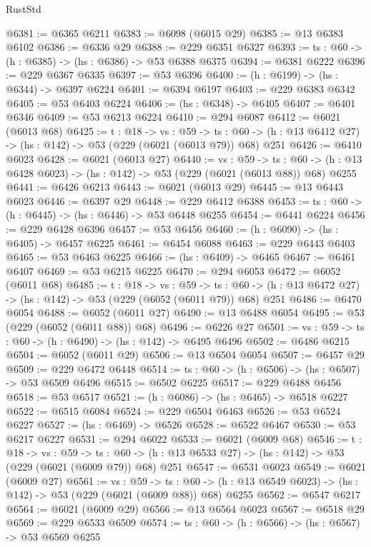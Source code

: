 \begin{lexlean}{RustStd}
\begin{coremodule}
@6381 := @6365 @6211
@6383 := @6098 (@6015 @29)
@6385 := @13 @6383 @6102
@6386 := @6336 @29
@6388 := @229 @6351 @6327
@6393 := {ts : @60} -> (h : @6385) -> (hs : @6386) -> @53 @6388 @6375
@6394 := @6381 @6222
@6396 := @229 @6367 @6335
@6397 := @53 @6396
@6400 := (h : @6199) -> (hs : @6344) -> @6397 @6224
@6401 := @6394 @6197
@6403 := @229 @6383 @6342
@6405 := @53 @6403 @6224
@6406 := (hs : @6348) -> @6405
@6407 := @6401 @6346
@6409 := @53 @6213 @6224
@6410 := @294 @6087
@6412 := @6021 (@6013 @68)
@6425 := {t : @18} ->
  {vs : @59} ->
  {ts : @60} -> (h : @13 @6412 @27) -> (hs : @142) -> @53 (@229 (@6021 (@6013 @79)) @68) @251
@6426 := @6410 @6023
@6428 := @6021 (@6013 @27)
@6440 := {vs : @59} ->
  {ts : @60} -> (h : @13 @6428 @6023) -> (hs : @142) -> @53 (@229 (@6021 (@6013 @88)) @68) @6255
@6441 := @6426 @6213
@6443 := @6021 (@6013 @29)
@6445 := @13 @6443 @6023
@6446 := @6397 @29
@6448 := @229 @6412 @6388
@6453 := {ts : @60} -> (h : @6445) -> (hs : @6446) -> @53 @6448 @6255
@6454 := @6441 @6224
@6456 := @229 @6428 @6396
@6457 := @53 @6456
@6460 := (h : @6090) -> (hs : @6405) -> @6457 @6225
@6461 := @6454 @6088
@6463 := @229 @6443 @6403
@6465 := @53 @6463 @6225
@6466 := (hs : @6409) -> @6465
@6467 := @6461 @6407
@6469 := @53 @6215 @6225
@6470 := @294 @6053
@6472 := @6052 (@6011 @68)
@6485 := {t : @18} ->
  {vs : @59} ->
  {ts : @60} -> (h : @13 @6472 @27) -> (hs : @142) -> @53 (@229 (@6052 (@6011 @79)) @68) @251
@6486 := @6470 @6054
@6488 := @6052 (@6011 @27)
@6490 := @13 @6488 @6054
@6495 := @53 (@229 (@6052 (@6011 @88)) @68)
@6496 := @6226 @27
@6501 := {vs : @59} -> {ts : @60} -> (h : @6490) -> (hs : @142) -> @6495 @6496
@6502 := @6486 @6215
@6504 := @6052 (@6011 @29)
@6506 := @13 @6504 @6054
@6507 := @6457 @29
@6509 := @229 @6472 @6448
@6514 := {ts : @60} -> (h : @6506) -> (hs : @6507) -> @53 @6509 @6496
@6515 := @6502 @6225
@6517 := @229 @6488 @6456
@6518 := @53 @6517
@6521 := (h : @6086) -> (hs : @6465) -> @6518 @6227
@6522 := @6515 @6084
@6524 := @229 @6504 @6463
@6526 := @53 @6524 @6227
@6527 := (hs : @6469) -> @6526
@6528 := @6522 @6467
@6530 := @53 @6217 @6227
@6531 := @294 @6022
@6533 := @6021 (@6009 @68)
@6546 := {t : @18} ->
  {vs : @59} ->
  {ts : @60} -> (h : @13 @6533 @27) -> (hs : @142) -> @53 (@229 (@6021 (@6009 @79)) @68) @251
@6547 := @6531 @6023
@6549 := @6021 (@6009 @27)
@6561 := {vs : @59} ->
  {ts : @60} -> (h : @13 @6549 @6023) -> (hs : @142) -> @53 (@229 (@6021 (@6009 @88)) @68) @6255
@6562 := @6547 @6217
@6564 := @6021 (@6009 @29)
@6566 := @13 @6564 @6023
@6567 := @6518 @29
@6569 := @229 @6533 @6509
@6574 := {ts : @60} -> (h : @6566) -> (hs : @6567) -> @53 @6569 @6255

\end{coremodule}
\end{lexlean}
